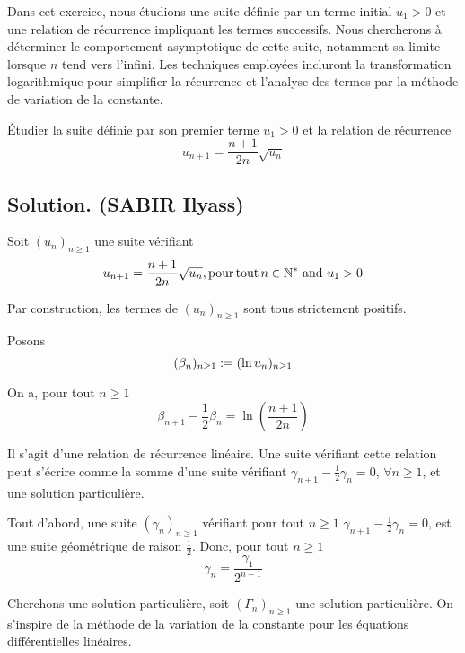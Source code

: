 Dans cet exercice, nous {\'e}tudions une suite d{\'e}finie par un terme
initial $u_1 > 0$ et une relation de r{\'e}currence impliquant les termes
successifs. Nous chercherons {\`a} d{\'e}terminer le comportement asymptotique
de cette suite, notamment sa limite lorsque $n$ tend vers l'infini. Les
techniques employ{\'e}es incluront la transformation logarithmique pour
simplifier la r{\'e}currence et l'analyse des termes par la m{\'e}thode de
variation de la constante.

\begin{exercise}[(Oral l'X 2007)]
{\'E}tudier la suite d{\'e}finie par son premier terme $u_1 > 0$ et la
relation de r{\'e}currence
\[ u_{n + 1} = \frac{n + 1}{2 n}  \sqrt{u_n} \]

\end{exercise}

\subsection*{Solution. (SABIR Ilyass)}

Soit $(u_n)_{n \geq 1}$ une suite v{\'e}rifiant
\[ u_{n + 1} = \frac{n + 1}{2 n}  \sqrt{u_n}, \operatorname{pour} \operatorname{tout} n \in
   \mathbb{N}^{\ast} \text{ and } u_1 > 0 \]


Par construction, les termes de $(u_n)_{n \geq 1}$ sont tous strictement
positifs.

Posons
\[ (\beta_n)_{n \geq 1} := (\ln u_n)_{n \geq 1} \]


On a, pour tout $n \geqslant 1$
\[ \beta_{n + 1} - \frac{1}{2} \beta_n = \ln \left( \frac{n + 1}{2 n} \right)
\]


Il s'agit d'une relation de r{\'e}currence lin{\'e}aire. Une suite
v{\'e}rifiant cette relation peut s'{\'e}crire comme la somme d'une suite
v{\'e}rifiant $\gamma_{n + 1} - \frac{1}{2} \gamma_n = 0$, $\forall n \geq 1$,
et une solution particuli{\`e}re.

Tout d'abord, une suite $(\gamma_n)_{n \geq 1}$ v{\'e}rifiant pour tout $n
\geq 1$ $\gamma_{n + 1} - \frac{1}{2} \gamma_n = 0$, est une suite
g{\'e}om{\'e}trique de raison $\frac{1}{2}$. Donc, pour tout $n \geq 1$
\[ \gamma_n = \frac{\gamma_1}{2^{n - 1}} \]


Cherchons une solution particuli{\`e}re, soit $(\Gamma_n)_{n \geq 1}$ une
solution particuli{\`e}re. On s'inspire de la m{\'e}thode de la variation de
la constante pour les {\'e}quations diff{\'e}rentielles lin{\'e}aires.

